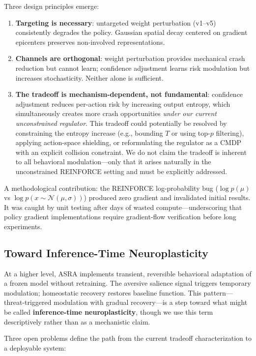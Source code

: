 \documentclass[runningheads]{llncs}
\begin{document}
Three design principles emerge:
\begin{enumerate}
\item \textbf{Targeting is necessary}: untargeted weight perturbation (v1--v5) consistently degrades the policy. Gaussian spatial decay centered on gradient epicenters preserves non-involved representations.
\item \textbf{Channels are orthogonal}: weight perturbation provides mechanical crash reduction but cannot learn; confidence adjustment learns risk modulation but increases stochasticity. Neither alone is sufficient.
\item \textbf{The tradeoff is mechanism-dependent, not fundamental}: confidence adjustment reduces per-action risk by increasing output entropy, which simultaneously creates more crash opportunities \emph{under our current unconstrained regulator}. This tradeoff could potentially be resolved by constraining the entropy increase (e.g., bounding $T$ or using top-$p$ filtering), applying action-space shielding, or reformulating the regulator as a CMDP with an explicit collision constraint. We do not claim the tradeoff is inherent to all behavioral modulation---only that it arises naturally in the unconstrained REINFORCE setting and must be explicitly addressed.
\end{enumerate}

A methodological contribution: the REINFORCE log-probability bug ($\log p(\mu)$ vs $\log p(x \sim \mathcal{N}(\mu, \sigma))$) produced zero gradient and invalidated initial results. It was caught by unit testing after days of wasted compute---underscoring that policy gradient implementations require gradient-flow verification before long experiments.

\subsection{Toward Inference-Time Neuroplasticity}

At a higher level, ASRA implements transient, reversible behavioral adaptation of a frozen model without retraining. The aversive salience signal triggers temporary modulation; homeostatic recovery restores baseline function. This pattern---threat-triggered modulation with gradual recovery---is a step toward what might be called \textbf{inference-time neuroplasticity}, though we use this term descriptively rather than as a mechanistic claim.

Three open problems define the path from the current tradeoff characterization to a deployable system:
\end{document}
